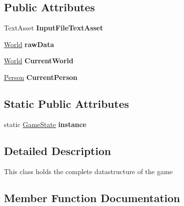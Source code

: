 \subsection*{Public Attributes}
\begin{DoxyCompactItemize}
\item 
\mbox{\label{class_dr_evil_1_1_data_structure_1_1_game_state_a3cd50bc1107cf91ccbec13fd363aa2be}} 
Text\+Asset {\bfseries Input\+File\+Text\+Asset}
\item 
\mbox{\label{class_dr_evil_1_1_data_structure_1_1_game_state_a0d6c7d61daeaf90c98e2b209afe31a32}} 
\mbox{\hyperlink{class_world}{World}} {\bfseries raw\+Data}
\item 
\mbox{\label{class_dr_evil_1_1_data_structure_1_1_game_state_a848ec94c9cd5ba5bd30436c0c4d3b52c}} 
\mbox{\hyperlink{class_world}{World}} {\bfseries Current\+World}
\item 
\mbox{\label{class_dr_evil_1_1_data_structure_1_1_game_state_a64868955af5972ecc885155f450c368a}} 
\mbox{\hyperlink{class_person}{Person}} {\bfseries Current\+Person}
\end{DoxyCompactItemize}
\subsection*{Static Public Attributes}
\begin{DoxyCompactItemize}
\item 
\mbox{\label{class_dr_evil_1_1_data_structure_1_1_game_state_a84e4952e23177b41b6c94c25add295af}} 
static \mbox{\hyperlink{class_dr_evil_1_1_data_structure_1_1_game_state}{Game\+State}} {\bfseries instance}
\end{DoxyCompactItemize}


\subsection{Detailed Description}
This class holds the complete datastructure of the game 



\subsection{Member Function Documentation}
\mbox{\label{class_dr_evil_1_1_data_structure_1_1_game_state_aefeb7ac3d896bc342f85fdd807ab5c82}} 

